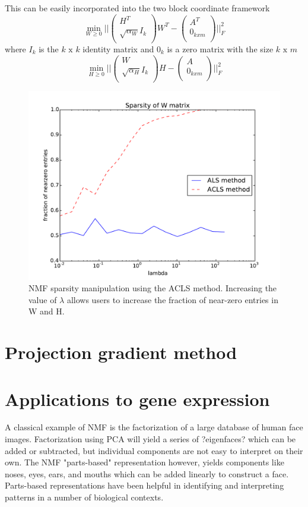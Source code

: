 \documentclass[final,leqno,onefignum,onetabnum]{siamltex1213}
\begin{document}
This can be easily incorporated into the two block coordinate framework 
\begin{equation}
    \min_{W \ge 0} || \left( \begin{array}{c} H^T   \\  \sqrt{\alpha_W}I_k \\ \end{array} \right) W^T- \left( \begin{array}{c} A^T   \\  0_{kxm} \\ \end{array} \right) ||^{2}_{F} 
\end{equation}
where $I_k$ is the $k\text{ x }k$ identity matrix and  $0_k$ is a zero matrix with the size $k\text{ x }m$
\begin{equation}
    \min_{H \ge 0} || \left( \begin{array}{c} W   \\  \sqrt{\alpha_H}I_k \\ \end{array} \right) H- \left( \begin{array}{c} A   \\  0_{kxm} \\ \end{array} \right) ||^{2}_{F} 
\end{equation}

\begin{figure}[h!]
  \centering
    \includegraphics[width=.5\linewidth]{ALS_vs_ACLS_sparsity}
  \caption{NMF sparsity manipulation using the ACLS method. Increasing the value of $\lambda$ allows users to increase the fraction of near-zero entries in W and H.}
\end{figure}


\section{Projection gradient method} 


\section{Applications to gene expression}
A classical example of NMF is the factorization of a large database of human face images. Factorization using PCA will yield a series of ?eigenfaces? which can be added or subtracted, but individual components are not easy to interpret on their own. The NMF "parts-based" representation however, yields components like noses, eyes, ears, and mouths which can be added linearly to construct a face. Parts-based representations have been helpful in identifying and interpreting patterns in a number of biological contexts. 
\end{document}
